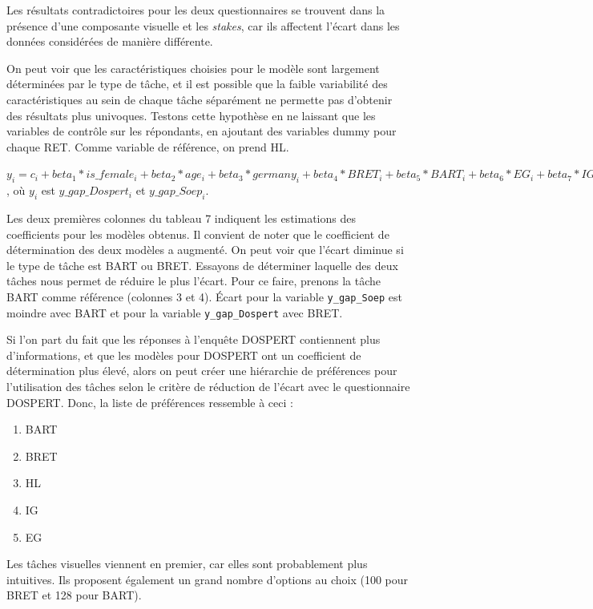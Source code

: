 \documentclass[12pt]{article}
\providecommand{\tightlist}{%
  \setlength{\itemsep}{0pt}\setlength{\parskip}{0pt}}
\begin{document}
Les résultats contradictoires pour les deux questionnaires se trouvent
dans la présence d'une composante visuelle et les \emph{stakes}, car ils
affectent l'écart dans les données considérées de manière différente.

On peut voir que les caractéristiques choisies pour le modèle sont
largement déterminées par le type de tâche, et il est possible que la
faible variabilité des caractéristiques au sein de chaque tâche
séparément ne permette pas d'obtenir des résultats plus univoques.
Testons cette hypothèse en ne laissant que les variables de contrôle sur
les répondants, en ajoutant des variables dummy pour chaque RET. Comme
variable de référence, on prend HL.

\(y_i = c_i + beta_1 * is\_female_i+ beta_2 * age_i + beta_3 * germany_i + beta_4 * BRET_i + beta_5 * BART_i + beta_6 * EG_i + beta_7 * IG_i + epsilon_i\)
, où \(y_i\) est \(y\_gap\_Dospert_i\) et \(y\_gap\_Soep_i\).

Les deux premières colonnes du tableau 7 indiquent les estimations des
coefficients pour les modèles obtenus. Il convient de noter que le
coefficient de détermination des deux modèles a augmenté. On peut voir
que l'écart diminue si le type de tâche est BART ou BRET. Essayons de
déterminer laquelle des deux tâches nous permet de réduire le plus
l'écart. Pour ce faire, prenons la tâche BART comme référence (colonnes
3 et 4). Écart pour la variable \texttt{y\_gap\_Soep} est moindre avec
BART et pour la variable \texttt{y\_gap\_Dospert} avec BRET.

Si l'on part du fait que les réponses à l'enquête DOSPERT contiennent
plus d'informations, et que les modèles pour DOSPERT ont un coefficient
de détermination plus élevé, alors on peut créer une hiérarchie de
préférences pour l'utilisation des tâches selon le critère de réduction
de l'écart avec le questionnaire DOSPERT. Donc, la liste de préférences
ressemble à ceci :

\begin{enumerate}
\def\labelenumi{\arabic{enumi}.}
\tightlist
\item
  BART
\item
  BRET
\item
  HL
\item
  IG
\item
  EG
\end{enumerate}

Les tâches visuelles viennent en premier, car elles sont probablement
plus intuitives. Ils proposent également un grand nombre d'options au
choix (100 pour BRET et 128 pour BART).
\end{document}
